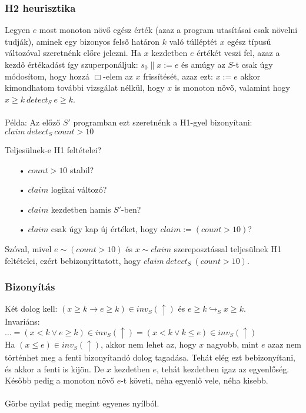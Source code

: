 \documentclass{article}
\newcommand{\true}{\uparrow}
\newcommand{\pp}{\parallel}
\begin{document}
\subsubsection*{H2 heurisztika}
Legyen $e$ most monoton növő egész érték (azaz a program utasításai csak növelni tudják), aminek egy bizonyos felső
határon $k$ való túlléptét $x$ egész típusú változóval szeretnénk előre jelezni. Ha $x$ kezdetben $e$ értékét veszi fel, azaz a kezdő értékadást így szuperponáljuk: $s_0 \pp x:=e$ és amúgy az $S$-t csak úgy módosítom, hogy hozzá $\Box$-elem az $x$ frissítését, azaz ezt: $x:=e$ akkor kimondhatom további vizsgálat nélkül, hogy $x$ is monoton növő, valamint hogy $x \geq k\ detect_S\ e \geq k$.
\\\\
Példa: Az előző $S'$ programban ezt szeretnénk a H1-gyel bizonyítani:\\
$claim\ detect_S\ count > 10$

Teljesülnek-e H1 feltételei?
\begin{enumerate}
\item[•] $count>10$ stabil? \checkmark
\item[•] $claim$ logikai változó? \checkmark
\item[•] $claim$ kezdetben hamis $S'$-ben? \checkmark
\item[•] $claim$ csak úgy kap új értéket, hogy $claim:=(count>10)$? \checkmark
\end{enumerate}
Szóval, mivel $e \sim (count>10)$ és $x \sim claim$ szereposztással teljesülnek H1 feltételei, ezért bebizonyíttatott, hogy $claim\ detect_S\ (count>10)$.
\subsubsection*{Bizonyítás}
Két dolog kell: $(x \geq k \rightarrow e \geq k) \in inv_S(\true)$ és $e \geq k \hookrightarrow_S x \geq k$.\\
Invariáns:\\
$\dots = (x < k \lor e \geq k) \in inv_S(\true) = (x < k \lor k \leq e) \in inv_S(\true)$\\
Ha $(x \leq e) \in inv_S(\true)$, akkor nem lehet az, hogy $x$ nagyobb, mint $e$ azaz nem történhet meg a fenti bizonyítandó dolog tagadása. Tehát elég ezt bebizonyítani, és akkor a fenti is kijön. De $x$ kezdetben $e$, tehát kezdetben igaz az egyenlőség. Később pedig a monoton növő $e$-t követi, néha egyenlő vele, néha kisebb.
\\\\
Görbe nyilat pedig megint egyenes nyílból.
\end{document}
